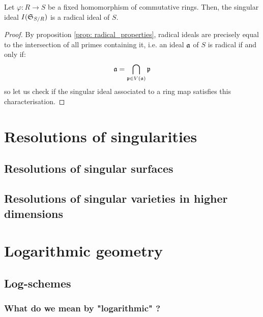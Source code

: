                 \begin{proposition}
                    Let $\varphi: R \to S$ be a fixed homomorphism of commutative rings. Then, the singular ideal $I(\mathfrak{S}_{S/R})$ is a radical ideal of $S$.
                \end{proposition}
                    \begin{proof}
                        By proposition \ref{prop: radical_properties}, radical ideals are precisely equal to the intersection of all primes containing it, i.e. an ideal $\mathfrak{a}$ of $S$ is radical if and only if:
                            $$\mathfrak{a} = \bigcap_{\mathfrak{p} \in V(\mathfrak{a})} \mathfrak{p}$$
                        so let us check if the singular ideal associated to a ring map satisfies this characterisation. 
                    \end{proof}
    
    \section{Resolutions of singularities}
        \subsection{Resolutions of singular surfaces}
        
        \subsection{Resolutions of singular varieties in higher dimensions}
        
    \section{Logarithmic geometry}
        \subsection{Log-schemes}
            \subsubsection{What do we mean by "logarithmic" ?}
            
